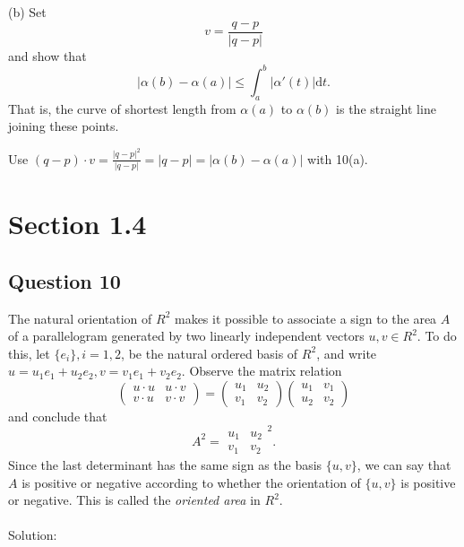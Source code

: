 \documentclass[12pt]{article}
\begin{document}
(b) Set $$v = \frac{q-p}{|q-p|}$$ and show that
$$|\alpha(b)-\alpha(a)| \leq \int_a^b |\alpha'(t)|\mathrm dt.$$
That is, the curve of shortest length from $\alpha(a)$ to $\alpha(b)$
is the straight line joining these points.

\begin{corollary}
     Use $(q-p)\cdot v = \frac{|q-p|^2}{|q-p|} = |q-p| = |\alpha(b) - \alpha(a)|$ with 10(a).
\end{corollary}
\section{Section 1.4}

\subsection*{Question 10}
The natural orientation of $R^2$ makes it possible to associate a sign to the area $A$ of a parallelogram generated by two linearly independent vectors $u,v \in R^2$. To do this, let $\{e_i\}, i = 1, 2$, be the natural ordered basis of $R^2$, and write $u = u_1e_1 +u_2e_2, v = v_1e_1 +v_2e_2$. Observe the matrix relation \begin{equation*}
    \begin{pmatrix}
    u \cdot u & u \cdot v\\
    v \cdot u & v \cdot v
    \end{pmatrix} =
    \begin{pmatrix}
    u_1 & u_2\\
    v_1 & v_2
    \end{pmatrix}
    \begin{pmatrix}
    u_1 & v_1\\
    u_2 & v_2
    \end{pmatrix}
\end{equation*}
and conclude that \begin{equation*}
    A^2 = \begin{array}{|cc|}
         u_1 & u_2\\
         v_1 & v_2
    \end{array}^2.
\end{equation*}
Since the last determinant has the same sign as the basis $\{u,v\}$, we can say that $A$ is positive or negative according to whether the orientation of $\{u,v\}$ is positive or negative. This is called the \textit{oriented area} in $R^2$.\\\\
Solution:
\end{document}
